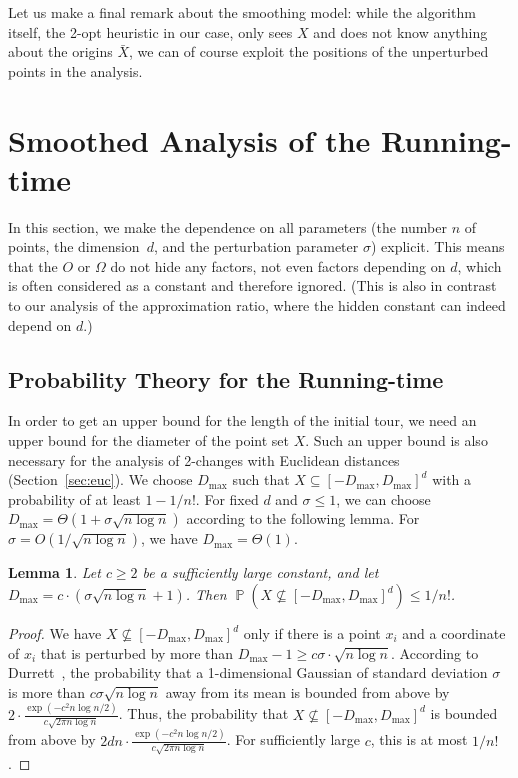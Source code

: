 \documentclass[11pt,DIV=12,a4paper]{scrartcl}
\newtheorem{lemma}[claim]{Lemma}
\newcommand{\maxx}{D_{\max}}
\DeclareMathOperator{\probab}{\mathbb{P}}
\begin{document}
Let us make a final remark about the smoothing model: while the algorithm itself, the 2-opt heuristic in our case, only sees $X$ and
does not know anything about the origins $\bar X$, we can of course exploit the positions of the unperturbed points in the analysis.


\section{Smoothed Analysis of the Running-time}
\label{sec:rt}

In this section, we make the dependence on all parameters (the number $n$ of points, the dimension~$d$, and the perturbation parameter $\sigma$) explicit.
This means that the $O$ or $\Omega$ do not hide any factors, not even factors depending  on $d$, which is often considered as a constant and therefore ignored. (This is also in contrast to our analysis of the approximation ratio, where the hidden constant can indeed depend on $d$.)


\subsection{Probability Theory for the Running-time}


In order to get an upper bound for the length of the initial tour, we need an upper bound
for the diameter of the point set $X$. Such an upper bound is also necessary for the analysis of 2-changes
with Euclidean distances (Section~\ref{sec:euc}).
We choose $\maxx$ such that $X \subseteq [-\maxx, \maxx]^d$ with a probability of at least
$1-1/n!$. For fixed $d$ and $\sigma \leq 1$, we can choose $\maxx = \Theta(1+\sigma
\sqrt{n \log n})$ according to the following lemma.
For $\sigma = O(1/\sqrt{n \log n})$, we have $\maxx = \Theta(1)$.

\begin{lemma}
\label{lem:maxx}
Let $c\geq 2$ be a sufficiently large constant, and let $\maxx = c \cdot
(\sigma\sqrt{n \log n} + 1)$. Then $\probab(X \not\subseteq [-\maxx, \maxx]^d) \leq 1/n!$.
\end{lemma}

\begin{proof}
We have $X \not\subseteq [-\maxx, \maxx]^d$ only if there is a point $x_i$ and a coordinate
of $x_i$ that is perturbed by more than $\maxx-1 \geq c \sigma \cdot \sqrt{n \log n}$. According to
Durrett~\cite[Theorem 1.2.3]{Durrett:Probability:2013},
the probability that a 1-dimensional Gaussian of standard deviation $\sigma$ is more than $c \sigma \sqrt{n \log n}$ away
from its mean
is bounded from above by $2 \cdot \frac{\exp(-c^2 n \log n /2)}{c \sqrt{2\pi n \log n}}$.
Thus, the probability that $X \not\subseteq [-\maxx, \maxx]^d$ is bounded from above
by $2dn \cdot \frac{\exp(-c^2 n \log n /2)}{c \sqrt{2\pi n \log n}}$.
For sufficiently large $c$, this is at most $1/n!$.
\end{proof}
\end{document}
